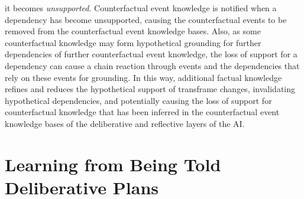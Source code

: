 it becomes \emph{unsupported}.  Counterfactual event knowledge is
notified when a dependency has become unsupported, causing the
counterfactual events to be removed from the counterfactual event
knowledge bases.  Also, as some counterfactual knowledge may form
hypothetical grounding for further dependencies of further
counterfactual event knowledge, the loss of support for a dependency
can cause a chain reaction through events and the dependencies that
rely on these events for grounding.  In this way, additional factual
knowledge refines and reduces the hypothetical support of transframe
changes, invalidating hypothetical dependencies, and potentially
causing the loss of support for counterfactual knowledge that has been
inferred in the counterfactual event knowledge bases of the
deliberative and reflective layers of the AI.

\section{Learning from Being Told Deliberative Plans}


